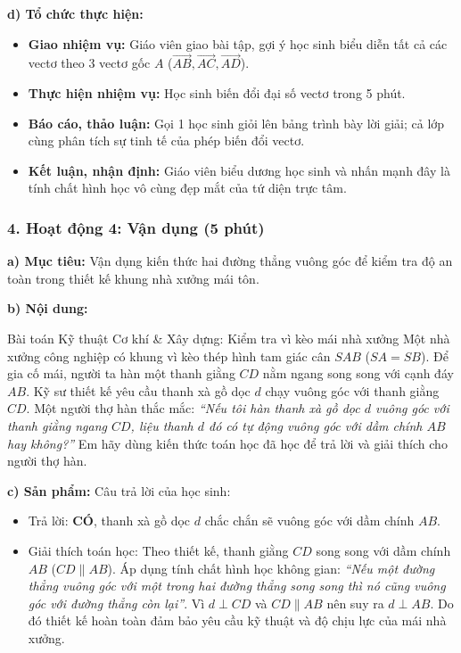 \documentclass[12pt, a4paper]{article}
\renewcommand{\vec}[1]{\overrightarrow{#1}}
\begin{document}
\noindent \textbf{d) Tổ chức thực hiện:}
\begin{itemize}[leftmargin=0.6cm]
    \item \textbf{Giao nhiệm vụ:} Giáo viên giao bài tập, gợi ý học sinh biểu diễn tất cả các vectơ theo 3 vectơ gốc $A$ ($\vec{AB}, \vec{AC}, \vec{AD}$).
    \item \textbf{Thực hiện nhiệm vụ:} Học sinh biến đổi đại số vectơ trong 5 phút.
    \item \textbf{Báo cáo, thảo luận:} Gọi 1 học sinh giỏi lên bảng trình bày lời giải; cả lớp cùng phân tích sự tinh tế của phép biến đổi vectơ.
    \item \textbf{Kết luận, nhận định:} Giáo viên biểu dương học sinh và nhấn mạnh đây là tính chất hình học vô cùng đẹp mắt của tứ diện trực tâm.
\end{itemize}

\subsubsection*{4. Hoạt động 4: Vận dụng (5 phút)}

\noindent \textbf{a) Mục tiêu:}
Vận dụng kiến thức hai đường thẳng vuông góc để kiểm tra độ an toàn trong thiết kế khung nhà xưởng mái tôn.

\noindent \textbf{b) Nội dung:}
\begin{stembox}{Bài toán Kỹ thuật Cơ khí & Xây dựng: Kiểm tra vì kèo mái nhà xưởng}
Một nhà xưởng công nghiệp có khung vì kèo thép hình tam giác cân $SAB$ ($SA = SB$). Để gia cố mái, người ta hàn một thanh giằng $CD$ nằm ngang song song với cạnh đáy $AB$. Kỹ sư thiết kế yêu cầu thanh xà gồ dọc $d$ chạy vuông góc với thanh giằng $CD$.
Một người thợ hàn thắc mắc: \textit{``Nếu tôi hàn thanh xà gồ dọc $d$ vuông góc với thanh giằng ngang $CD$, liệu thanh $d$ đó có tự động vuông góc với dầm chính $AB$ hay không?''}
Em hãy dùng kiến thức toán học đã học để trả lời và giải thích cho người thợ hàn.
\end{stembox}

\noindent \textbf{c) Sản phẩm:}
Câu trả lời của học sinh:
\begin{itemize}
    \item Trả lời: \textbf{CÓ}, thanh xà gồ dọc $d$ chắc chắn sẽ vuông góc với dầm chính $AB$.
    \item Giải thích toán học: Theo thiết kế, thanh giằng $CD$ song song với dầm chính $AB$ ($CD \parallel AB$).
    Áp dụng tính chất hình học không gian: \textit{``Nếu một đường thẳng vuông góc với một trong hai đường thẳng song song thì nó cũng vuông góc với đường thẳng còn lại''}.
    Vì $d \perp CD$ và $CD \parallel AB$ nên suy ra $d \perp AB$. Do đó thiết kế hoàn toàn đảm bảo yêu cầu kỹ thuật và độ chịu lực của mái nhà xưởng.
\end{itemize}
\end{document}

